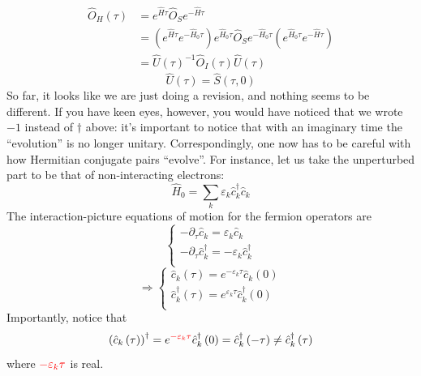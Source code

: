 \begin{align*}
    \hat{O}_H\left( \tau \right) &=e^{\hat{H}\tau}\hat{O}_Se^{-\hat{H}\tau}\\
    &=\left( e^{\hat{H}\tau}e^{-\hat{H}_0\tau} \right) e^{\hat{H}_0\tau}\hat{O}_Se^{-\hat{H}_0\tau}\left( e^{\hat{H}_0\tau}e^{-\hat{H}\tau} \right) \\
    &=\hat{U}\left( \tau \right) ^{-1}\hat{O}_I\left( \tau \right) \hat{U}\left( \tau \right)
\end{align*}
\[ \hat{U}\left( \tau \right) =\hat{S}\left( \tau ,0 \right) \]
So far, it looks like we are just doing a revision, and nothing seems to be different. If you have keen eyes, however, you would have noticed that we wrote $-1$ instead of $\dagger$ above: it's important to notice that with an imaginary time the ``evolution'' is no longer unitary. Correspondingly, one now has to be careful with how Hermitian conjugate pairs ``evolve''. For instance, let us take the unperturbed part to be that of non-interacting electrons:
\[ \hat{H}_0=\sum_k{\varepsilon _k\hat{c}_{k}^{\dagger}\hat{c}_k}\]
The interaction-picture equations of motion for the fermion operators are
\[ \begin{cases}
	-\partial _{\tau}\hat{c}_k=\varepsilon _k\hat{c}_k\\
	-\partial _{\tau}\hat{c}_{k}^{\dagger}=-\varepsilon _k\hat{c}_{k}^{\dagger}\\
\end{cases}\]
\[ \Rightarrow \begin{cases}
	\hat{c}_k\left( \tau \right) =e^{-\varepsilon _k\tau}\hat{c}_k\left( 0 \right)\\
	\hat{c}_{k}^{\dagger}\left( \tau \right) =e^{\varepsilon _k\tau}\hat{c}_{k}^{\dagger}\left( 0 \right)\\
\end{cases}\]
Importantly, notice that
\[ \left( \hat{c}_k\left( \tau \right) \right) ^{\dagger}=e^{{\color{red} -\varepsilon _k\tau }}\hat{c}_{k}^{\dagger}\left( 0 \right) =\hat{c}_{k}^{\dagger}\left( -\tau \right) \ne \hat{c}_{k}^{\dagger}\left( \tau \right) \]
where ${\color{red} -\varepsilon_k\tau}$ is real.
